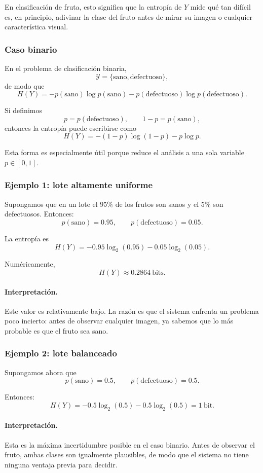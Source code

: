 \documentclass{article}
\begin{document}
En clasificación de fruta, esto significa que la entropía de \(Y\) mide qué tan difícil es, en principio, adivinar la clase del fruto antes de mirar su imagen o cualquier característica visual.

\subsubsection*{Caso binario}

En el problema de clasificación binaria,
\[
\mathcal{Y}=\{\text{sano},\text{defectuoso}\},
\]
de modo que
\[
H(Y)=-p(\text{sano})\log p(\text{sano})-p(\text{defectuoso})\log p(\text{defectuoso}).
\]

Si definimos
\[
p=p(\text{defectuoso}),
\qquad
1-p=p(\text{sano}),
\]
entonces la entropía puede escribirse como
\[
H(Y)=-(1-p)\log(1-p)-p\log p.
\]

Esta forma es especialmente útil porque reduce el análisis a una sola variable \(p\in[0,1]\).

\subsubsection*{Ejemplo 1: lote altamente uniforme}

Supongamos que en un lote el \(95\%\) de los frutos son sanos y el \(5\%\) son defectuosos. Entonces:
\[
p(\text{sano})=0.95,\qquad p(\text{defectuoso})=0.05.
\]

La entropía es
\[
H(Y)= -0.95\log_2(0.95)-0.05\log_2(0.05).
\]

Numéricamente,
\[
H(Y)\approx 0.2864\ \text{bits}.
\]

\paragraph{Interpretación.}
Este valor es relativamente bajo. La razón es que el sistema enfrenta un problema poco incierto: antes de observar cualquier imagen, ya sabemos que lo más probable es que el fruto sea sano.

\subsubsection*{Ejemplo 2: lote balanceado}

Supongamos ahora que
\[
p(\text{sano})=0.5,\qquad p(\text{defectuoso})=0.5.
\]

Entonces:
\[
H(Y)= -0.5\log_2(0.5)-0.5\log_2(0.5)=1\ \text{bit}.
\]

\paragraph{Interpretación.}
Esta es la máxima incertidumbre posible en el caso binario. Antes de observar el fruto, ambas clases son igualmente plausibles, de modo que el sistema no tiene ninguna ventaja previa para decidir.
\end{document}
